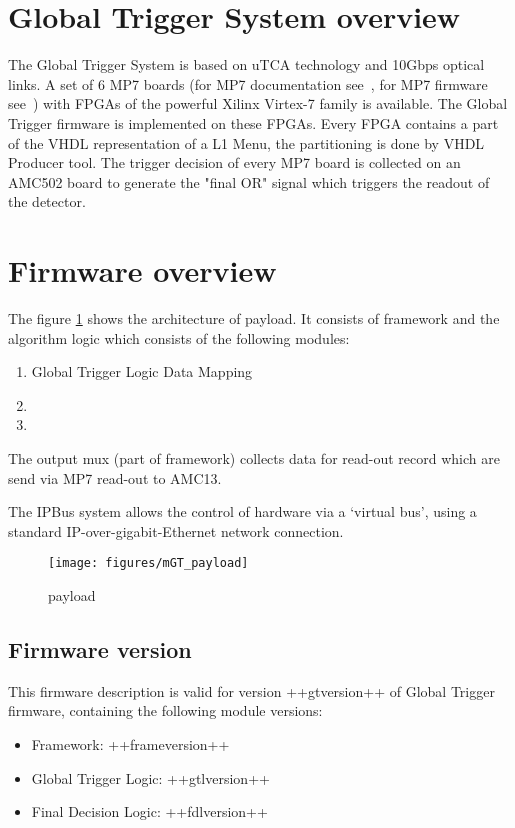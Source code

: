 \section{Global Trigger System overview}\label{sec:fw:gt_system}

The Global Trigger System is based on uTCA technology and 10Gbps optical links. A set of 6 MP7 boards (for MP7 documentation see~\cite{MP7}, for MP7 firmware see~\cite{MP7 firmware}) with FPGAs of the powerful Xilinx Virtex-7 family is available. The Global Trigger firmware is implemented on these FPGAs. Every FPGA contains a part of the VHDL representation of a L1 Menu, the partitioning is done by VHDL Producer tool. The trigger decision of every MP7 board is collected on an AMC502 board to generate the "final OR" signal which triggers the readout of the detector.

\section{Firmware overview}\label{sec:fw:fw}
The figure \ref{fig:mgt} shows the architecture of \ugt payload. It consists of framework and the algorithm logic which consists of the following modules:
\begin{enumerate}
\item Global Trigger Logic Data Mapping
\item \ugtl
\item \ufdl
\end{enumerate}

The output mux (part of framework) collects data for read-out record which are send via MP7 read-out to AMC13.

The IPBus system allows the control of hardware via a ‘virtual bus’, using a standard IP-over-gigabit-Ethernet network connection.
\begin{figure}[h!]
   \centering
    \texttt{[image: figures/mGT\_payload]}
    \caption{\ugt payload}\label{fig:mgt}
 \end{figure}

\subsection{Firmware version}\label{sec:fw:fw_version}

This firmware description is valid for version ++gtversion++ of Global Trigger firmware, containing the following module versions:
\begin{itemize}
\item Framework: ++frameversion++
\item Global Trigger Logic: ++gtlversion++
\item Final Decision Logic: ++fdlversion++
\end{itemize}

